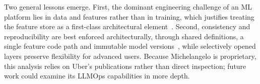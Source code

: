 Two general lessons emerge. First, the dominant engineering challenge of
an ML platform lies in data and features rather than in training, which
justifies treating the feature store as a first-class architectural
element~\cite{delbalso2018scaling}. Second, consistency and
reproducibility are best enforced architecturally, through shared
definitions, a single feature code path and immutable model
versions~\cite{delbalso2017meet,sun2020gallery}, while selectively opened
layers preserve flexibility for advanced users. Because Michelangelo is
proprietary, this analysis relies on Uber's publications rather than
direct inspection; future work could examine its LLMOps capabilities in
more depth.